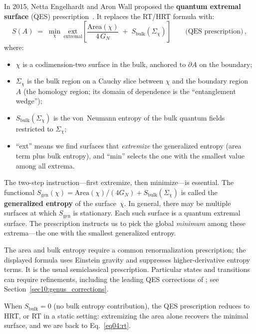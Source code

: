 \documentclass[11pt,letterpaper]{article}
\theoremstyle{plain}
\theoremstyle{definition}
\theoremstyle{remark}
\begin{document}
In 2015, Netta Engelhardt and Aron Wall proposed the \textbf{quantum
extremal surface} (QES) prescription~\citeyearpar{engelhardtwall2015}.  It
replaces the RT/HRT formula with:
\begin{equation}
\label{eq04:qes}
\boxed{
S(A) \;=\; \min_{\chi}\,\underset{\text{extremal}}{\mathrm{ext}}
\left[
  \frac{\mathrm{Area}(\chi)}{4\,G_{N}}
  \;+\; S_{\mathrm{bulk}}(\Sigma_{\chi})
\right]
}
\qquad\text{(QES prescription)}\,,
\end{equation}
where:
\begin{itemize}
\item $\chi$ is a codimension-two surface in the bulk, anchored to
  $\partial A$ on the boundary;
\item $\Sigma_{\chi}$ is the bulk region on a Cauchy slice between
  $\chi$ and the boundary region~$A$ (the homology region; its
  domain of dependence is the ``entanglement wedge'');
\item $S_{\mathrm{bulk}}(\Sigma_{\chi})$ is the von~Neumann entropy
  of the bulk quantum fields restricted to $\Sigma_{\chi}$;
\item ``ext'' means we find surfaces that \emph{extremize} the
  generalized entropy (area term plus bulk entropy), and ``min''
  selects the one with the smallest value among all extrema.
\end{itemize}

The two-step instruction---first extremize, then minimize---is
essential.  The functional
$S_{\mathrm{gen}}(\chi) = \mathrm{Area}(\chi)/(4G_N) +
S_{\mathrm{bulk}}(\Sigma_\chi)$
is called the \textbf{generalized entropy} of the surface~$\chi$.  In
general, there may be multiple surfaces at which
$S_{\mathrm{gen}}$ is stationary.  Each such surface is a quantum
extremal surface.  The prescription instructs us to pick the global
\emph{minimum} among these extrema---the one with the smallest
generalized entropy.

The area and bulk entropy require a common renormalization prescription;
the displayed formula uses Einstein gravity and suppresses higher-derivative
entropy terms. It is the usual semiclassical prescription. Particular
states and transitions can require refinements, including the leading
QES corrections of \citet{akerspenington2021}; see
Section~\ref{sec10:genus_corrections}.

When $S_{\mathrm{bulk}} = 0$ (no bulk entropy contribution), the QES
prescription reduces to HRT, or RT in a static setting: extremizing the area
alone recovers the minimal surface, and we are back to
Eq.~\eqref{eq04:rt}.
\end{document}

